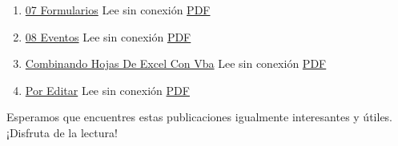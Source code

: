 \documentclass[
  jou,
  floatsintext,
  longtable,
  a4paper,
  nolmodern,
  notxfonts,
  notimes,
  colorlinks=true,linkcolor=blue,citecolor=blue,urlcolor=blue]{apa7}
\begin{document}
\begin{enumerate}
{  Funciones Iterativas Estructuras Repetitivas O Bucles} Lee sin
  conexión
  \href{https://achalmaedison.netlify.app/herramientas-oficina/ofimatica/2023-01-09-06-funciones-iterativas-estructuras-repetitivas-o-bucles/index.pdf}{PDF}
\item
  \href{https://achalmaedison.netlify.app/herramientas-oficina/ofimatica/2023-01-16-07-formularios}{07
  Formularios} Lee sin conexión
  \href{https://achalmaedison.netlify.app/herramientas-oficina/ofimatica/2023-01-16-07-formularios/index.pdf}{PDF}
\item
  \href{https://achalmaedison.netlify.app/herramientas-oficina/ofimatica/2023-01-23-08-eventos}{08
  Eventos} Lee sin conexión
  \href{https://achalmaedison.netlify.app/herramientas-oficina/ofimatica/2023-01-23-08-eventos/index.pdf}{PDF}
\item
  \href{https://achalmaedison.netlify.app/herramientas-oficina/ofimatica/2023-05-31-combinando-hojas-de-excel-con-vba}{Combinando
  Hojas De Excel Con Vba} Lee sin conexión
  \href{https://achalmaedison.netlify.app/herramientas-oficina/ofimatica/2023-05-31-combinando-hojas-de-excel-con-vba/index.pdf}{PDF}
\item
  \href{https://achalmaedison.netlify.app/herramientas-oficina/ofimatica/2024-03-31-por-editar}{Por
  Editar} Lee sin conexión
  \href{https://achalmaedison.netlify.app/herramientas-oficina/ofimatica/2024-03-31-por-editar/index.pdf}{PDF}
\end{enumerate}

Esperamos que encuentres estas publicaciones igualmente interesantes y
útiles. ¡Disfruta de la lectura!
\end{document}
